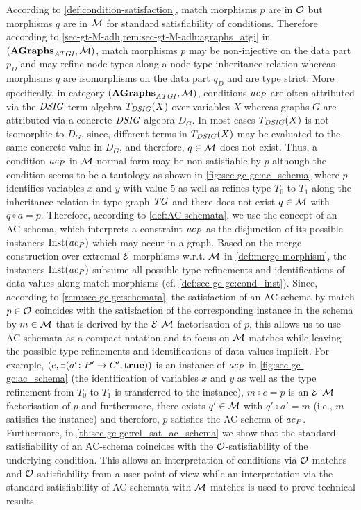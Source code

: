 According to \cref{def:condition-satisfaction}, match morphisms $p$ are in ${\cal O}$ but morphisms $q$ are in ${\cal M}$ for standard satisfiability of conditions.
Therefore according to \cref{sec-gt-M-adh,rem:sec-gt-M-adh:agraphs_atgi} in $(\mathbf{AGraphs}_\mathit{ATGI},{\cal M})$, match morphisms $p$ may be non-injective on the data part $p_D$ and may refine node types along a node type inheritance relation whereas morphisms $q$ are isomorphisms on the data part $q_D$ and are type strict.
More specifically, in category $(\mathbf{AGraphs}_\mathit{ATGI},{\cal M})$, conditions $\mathit{ac}_P$ are often attributed via the $\mathit{DSIG}$-term algebra $T_\mathit{DSIG}(X)$ over variables $X$ whereas graphs $G$ are attributed via a concrete $\mathit{DSIG}$-algebra $D_G$.
In most cases $T_\mathit{DSIG}(X)$ is not isomorphic to $D_G$, since, different terms in $T_\mathit{DSIG}(X)$ may be evaluated to the same concrete value in $D_G$, and therefore, $q \in {\cal M}$ does not exist.
Thus, a condition $\mathit{ac}_P$ in ${\cal M}$-normal form may be non-satisfiable by $p$ although the condition seems to be a tautology as shown in \cref{fig:sec-gc-gc:ac_schema} where $p$ identifies variables $x$ and $y$ with value $5$ as well as refines type $T_0$ to $T_1$ along the inheritance relation in type graph $\mathit{TG}$ and there does not exist $q \in {\cal M}$ with $q \circ a=p$.
Therefore, according to \cref{def:AC-schemata}, we use the concept of an AC-schema, which interprets a constraint $\mathit{ac}_P$ as the disjunction of its possible instances $\mathrm{Inst}(\mathit{ac}_P)$ which may occur in a graph.
Based on the merge construction over extremal $\mathcal{E}$-morphisms w.r.t. ${\cal M}$ in \cref{def:merge morphism}, the instances $\mathrm{Inst}(\mathit{ac}_P)$ subsume all possible type refinements and identifications of data values along match morphisms (cf. \cref{def:sec-gc-gc:cond_inst}).
Since, according to \cref{rem:sec-gc-gc:schemata}, the satisfaction of an AC-schema by match $p \in {\cal O}$ coincides with the satisfaction of the corresponding instance in the schema by $m \in {\cal M}$ that is derived by the $\mathcal{E}$-${\cal M}$ factorisation of $p$, this allows us to use AC-schemata as a compact notation and to focus on ${\cal M}$-matches while leaving the possible type refinements and identifications of data values implicit.
For example, $(e,\exists(a'\colon P' \to C',\textbf{true}))$ is an instance of $\mathit{ac}_P$ in \cref{fig:sec-gc-gc:ac_schema} (the identification of variables $x$ and $y$ as well as the type refinement from $T_0$ to $T_1$ is transferred to the instance), $m \circ e=p$ is an $\mathcal{E}$-${\cal M}$ factorisation of $p$ and furthermore, there exists $q' \in {\cal M}$ with $q' \circ a'=m$ (i.e., $m$ satisfies the instance) and therefore, $p$ satisfies the AC-schema of $\mathit{ac}_P$.
Furthermore, in \cref{th:sec-gc-gc:rel_sat_ac_schema} we show that the standard satisfiability of an AC-schema coincides with the ${\cal O}$-satisfiability of the underlying condition.
This allows an interpretation of conditions via ${\cal O}$-matches and ${\cal O}$-satisfiability from a user point of view while an interpretation via the standard satisfiability of AC-schemata with ${\cal M}$-matches is used to prove technical results.


